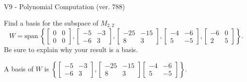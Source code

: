 \begin{exercise}
  \begin{exerciseTitle}V9 - Polynomial Computation (ver. 788)\end{exerciseTitle}
  \begin{exerciseStatement}
    Find a basis for the subspace of \(M_{2,2}\) 
\[W=\mathrm{span}\ \left\{\left[\begin{array}{cc}
0 & 0 \\
0 & 0
\end{array}\right] , \left[\begin{array}{cc}
-5 & -3 \\
-6 & 3
\end{array}\right] , \left[\begin{array}{cc}
-25 & -15 \\
8 & 3
\end{array}\right] , \left[\begin{array}{cc}
-4 & -6 \\
5 & -5
\end{array}\right] , \left[\begin{array}{cc}
-6 & 0 \\
2 & 5
\end{array}\right]\right\}.\]
 Be sure to explain why your result is a basis.


  \end{exerciseStatement}
  \begin{exerciseAnswer}
   A basis of \(W\) is  \(\left\{\left[\begin{array}{cc}
-5 & -3 \\
-6 & 3
\end{array}\right] , \left[\begin{array}{cc}
-25 & -15 \\
8 & 3
\end{array}\right] \left[\begin{array}{cc}
-4 & -6 \\
5 & -5
\end{array}\right]\right\}\).
  


  \end{exerciseAnswer}
\end{exercise}